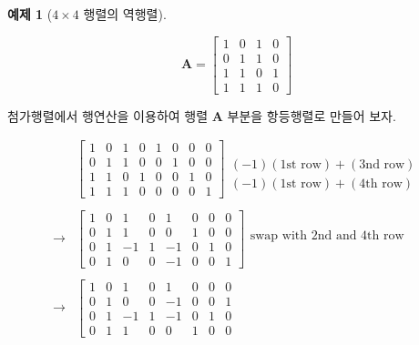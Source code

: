 \documentclass[
  11pt,
  a4paper,
  oneside]{scrbook}
\theoremstyle{definition}
\theoremstyle{definition}
\newtheorem{exercise}{예제}[chapter]
\theoremstyle{plain}
\theoremstyle{remark}
\begin{document}
\begin{exercise}[\(4 \times 4\) 행렬의
역행렬]\protect\hypertarget{exr-inverse2}{}\label{exr-inverse2}

\[ \pmb A =
\begin{bmatrix}
1 & 0 & 1 & 0 \\
0 & 1 & 1 & 0 \\
1 & 1 & 0 & 1 \\
1 & 1 & 1 & 0
\end{bmatrix}
\]

첨가행렬에서 행연산을 이용하여 행렬 \(\pmb A\) 부분을 항등행렬로 만들어
보자.

\[
\begin{aligned}
& \left[\begin{array}{cccc|cccc}
1 & 0 & 1 & 0 & 1 & 0 & 0 & 0\\
0 & 1 & 1 & 0 & 0 & 1 & 0 & 0\\
1 & 1 & 0 & 1 & 0 & 0 & 1 & 0\\
1 & 1 & 1 & 0 & 0 & 0 & 0 & 1
\end{array}\right]  
\begin{array}{c}
 \\
 \\
(-1)(\text{1st row}) + (\text{3nd row}) \\
(-1)(\text{1st row}) + (\text{4th row}) 
\end{array}  \\
& \\
\rightarrow & 
 \left[\begin{array}{cccc|cccc}
1 & 0 & 1 & 0 & 1 & 0 & 0 & 0\\
0 & 1 & 1 & 0 & 0 & 1 & 0 & 0\\
0 & 1 & -1 & 1 & -1 & 0 & 1 & 0\\
0 & 1 & 0  & 0 & -1 & 0 & 0 & 1
\end{array}\right]  
\begin{array}{c}
 \\
\text{swap with 2nd and 4th row} \\
 \\
 \end{array}  \\
 & \\
\rightarrow & 
 \left[\begin{array}{cccc|cccc}
1 & 0 & 1 & 0 & 1 & 0 & 0 & 0\\
0 & 1 & 0  & 0 & -1 & 0 & 0 & 1 \\
0 & 1 & -1 & 1 & -1 & 0 & 1 & 0\\
0 & 1 & 1 & 0 & 0 & 1 & 0 & 0 

\end{array}
\end{aligned}\]
\end{exercise}
\end{document}
